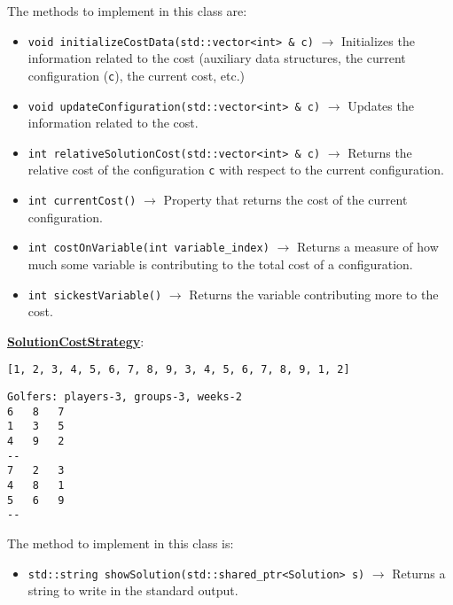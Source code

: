 The methods to implement in this class are:

\begin{itemize}
\item \verb|void initializeCostData(std::vector<int> & c)| $\rightarrow$ Initializes the information related to the cost (auxiliary data structures, the current configuration (\verb|c|), the current cost, etc.)
\item \verb|void updateConfiguration(std::vector<int> & c)| $\rightarrow$ Updates the information related to the cost.
\item \verb|int relativeSolutionCost(std::vector<int> & c)| $\rightarrow$ Returns the relative cost of the configuration \verb|c| with respect to the current configuration.
\item \verb|int currentCost()| $\rightarrow$ Property that returns the cost of the current configuration.
\item \verb|int costOnVariable(int variable_index)| $\rightarrow$ Returns a measure of how much some variable is contributing to the total cost of a configuration. %
\item \verb|int sickestVariable()| $\rightarrow$ Returns the variable contributing more to the cost.
\end{itemize}

\underline{\textbf{SolutionCostStrategy}}: 

\begin{Verbatim}
[1, 2, 3, 4, 5, 6, 7, 8, 9, 3, 4, 5, 6, 7, 8, 9, 1, 2]
\end{Verbatim}


\begin{Verbatim}
Golfers: players-3, groups-3, weeks-2
6	8	7	
1	3	5	
4	9	2	
--
7	2	3	
4	8	1	
5	6	9	
--
\end{Verbatim}

The method to implement in this class is:

\begin{itemize}
\item \verb|std::string showSolution(std::shared_ptr<Solution> s)| $\rightarrow$ Returns a string to write in the standard output.
\end{itemize}

